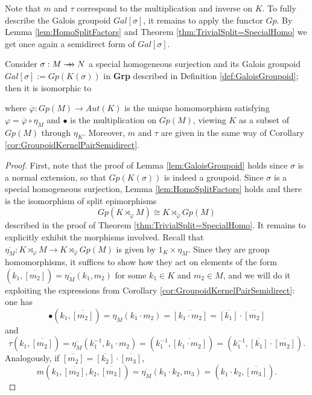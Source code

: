 Note that $m$ and $\tau$ correspond to the multiplication and inverse on $K$. To fully describe the Galois groupoid $Gal[\sigma]$, it remains to apply the functor $Gp$. By Lemma \ref{lem:HomoSplitFactors} and Theorem \ref{thm:TrivialSplit=SpecialHomo} we get once again a semidirect form of $Gal[\sigma]$.

\begin{proposition}
\label{prop:GaloisGroupoidSemidirect}
    Consider $\sigma:M\rrightarrow N$ a special homogeneous surjection and its Galois groupoid $Gal[\sigma] :=Gp(K(\sigma))$ in \textbf{Grp} described in Definition \ref{def:GaloisGroupoid}; then it is isomorphic to
    \begin{center}
    \end{center}
    where $\overline{\varphi}:Gp(M)\to Aut(K)$ is the unique homomorphism satisfying $\varphi = \overline{\varphi}\circ \eta_M$ and $\bullet$ is the multiplication on $Gp(M)$, viewing $K$ as a subset of $Gp(M)$ through $\eta_K$. Moreover, $m$ and $\tau$ are given in the same way of Corollary \ref{cor:GroupoidKernelPairSemidirect}.
    \begin{proof}
        First, note that the proof of Lemma \ref{lem:GaloisGroupoid} holds since $\sigma$ is a normal extension, so that $Gp(K(\sigma))$ is indeed a groupoid. Since $\sigma$ is a special homogeneous surjection, Lemma \ref{lem:HomoSplitFactors} holds and there is the isomorphism of split epimorphisms
        \[ Gp(K\rtimes_\varphi M)\cong K\rtimes_{\overline{\varphi}} Gp(M) \]
        described in the proof of Theorem \ref{thm:TrivialSplit=SpecialHomo}. It remains to explicitly exhibit the morphisms involved. Recall that $\overline{\eta_M}:K\rtimes_\varphi M\to K\rtimes_{\overline{\varphi}}Gp(M)$ is given by $1_K\times \eta_M$. Since they are group homomorphisms, it suffices to show how they act on elements of the form $(k_1,\overline{[m_2]}) = \overline{\eta_M}(k_1,m_2)$ for some $k_1\in K$ and $m_2\in M$, and we will do it exploiting the expressions from Corollary \ref{cor:GroupoidKernelPairSemidirect}: one has
        \[ \bullet(k_1, \overline{[m_2]}) = \eta_M(k_1\cdot m_2) = \overline{[k_1\cdot m_2]} = \overline{[k_1]}\cdot \overline{[m_2]} \]
        and
        \[ \tau(k_1,\overline{[m_2]}) = \overline{\eta_M}(k_1^{-1}, k_1\cdot m_2) = (k_1^{-1}, \overline{[k_1\cdot m_2]}) = (k_1^{-1}, \overline{[k_1]}\cdot \overline{[m_2]}). \]
        Analogously, if $\overline{[m_2]} = \overline{[k_2]}\cdot \overline{[m_3]}$,
        \[ m(k_1,\overline{[m_2]},k_2,\overline{[m_3]}) = \overline{\eta_M}(k_1\cdot k_2, m_3) = (k_1\cdot k_2, \overline{[m_3]}). \]
    \end{proof}
\end{proposition}
